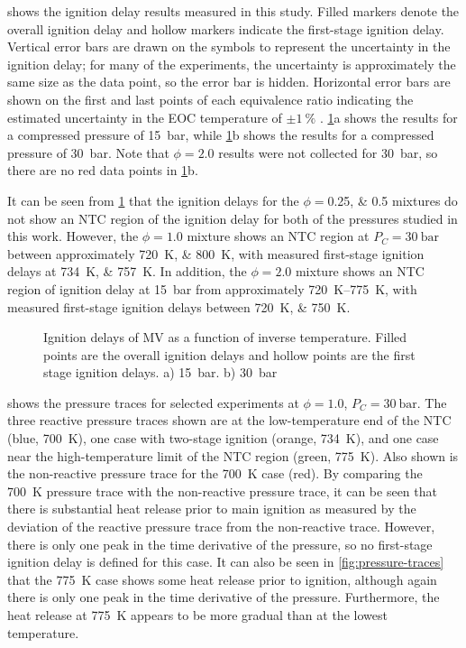 \documentclass[12pt]{../ussci}
\begin{document}
 shows the ignition delay results measured in this
study. Filled markers denote the overall ignition delay and hollow markers
indicate the first-stage ignition delay. Vertical error bars are drawn on the
symbols to represent the uncertainty in the ignition delay; for many of the
experiments, the uncertainty is approximately the same size as the data point,
so the error bar is hidden. Horizontal error bars are shown on the first and
last points of each equivalence ratio indicating the estimated uncertainty in
the EOC temperature of $\pm\SI{1}{\percent}$ \cite{Weber2015}.
\cref{fig:ignition-delays}a shows the results for a compressed pressure of
\SI{15}{\bar}, while \cref{fig:ignition-delays}b shows the results for a
compressed pressure of \SI{30}{\bar}. Note that $\phi=2.0$ results were not
collected for \SI{30}{\bar}, so there are no red data points in
\cref{fig:ignition-delays}b.

It can be seen from \cref{fig:ignition-delays} that the ignition delays for the
\(\phi=\)\numlist{0.25;0.5} mixtures do not show an NTC region of the ignition
delay for both of the pressures studied in this work. However, the $\phi=1.0$
mixture shows an NTC region at $P_C=\SI{30}{\bar}$ between approximately
\SIlist{720;800}{\K}, with measured first-stage ignition delays at
\SIlist{734;757}{\K}. In addition, the $\phi=2.0$ mixture shows an NTC region of
ignition delay at \SI{15}{\bar} from approximately \SIrange{720}{775}{\K}, with
measured first-stage ignition delays between \SIlist{720;750}{\K}.

\begin{figure}[htb]
    \centering
    
    \caption{Ignition delays of MV as a function of inverse temperature. Filled
    points are the overall ignition delays and hollow points are the first stage
    ignition delays. a) \SI{15}{\bar}. b) \SI{30}{\bar}}
    \label{fig:ignition-delays}
\end{figure}

 shows the pressure traces for selected experiments at
\(\phi=1.0\), \(P_C =\SI{30}{\bar}\). The three reactive pressure traces shown
are at the low-temperature end of the NTC (blue, \SI{700}{\K}), one case with
two-stage ignition (orange, \SI{734}{\K}), and one case near the
high-temperature limit of the NTC region (green, \SI{775}{\K}). Also shown is
the non-reactive pressure trace for the \SI{700}{\K} case (red). By comparing
the \SI{700}{\K} pressure trace with the non-reactive pressure trace, it can be
seen that there is substantial heat release prior to main ignition as measured
by the deviation of the reactive pressure trace from the non-reactive trace.
However, there is only one peak in the time derivative of the pressure, so no
first-stage ignition delay is defined for this case. It can also be seen in
\cref{fig:pressure-traces} that the \SI{775}{\K} case shows some heat release
prior to ignition, although again there is only one peak in the time derivative
of the pressure. Furthermore, the heat release at \SI{775}{\K} appears to be
more gradual than at the lowest temperature.
\end{document}
